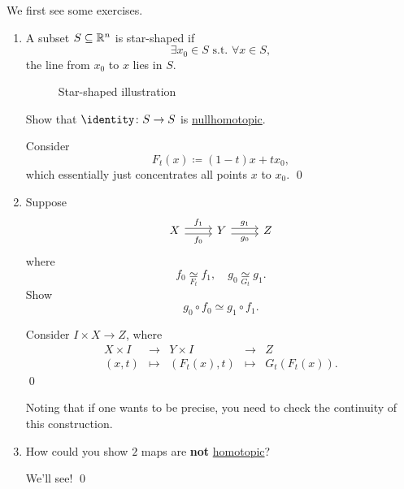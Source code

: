 \begin{exercise}
	We first see some exercises.
	\begin{enumerate}
		\item A subset \(S\subseteq \mathbb{\MakeUppercase{R}} ^n\) is star-shaped if
		      \[
			      \exists x_0\in S \text{ s.t. }\forall x\in S,
		      \]
		      the line from \(x_0\) to \(x\) lies in \(S\).
		      \begin{figure}[H]
			      \centering
			      \caption{Star-shaped illustration}
			      \label{fig:eg:star-shaped}
		      \end{figure}
		      Show that \(\identity\colon S\to S\) is \hyperref[def:nullhomotopic]{nullhomotopic}.

		      \begin{answer}
			      Consider
			      \[
				      F_{t}(x) \coloneqq (1 - t)x+tx_0,
			      \]
			      which essentially just concentrates all points \(x\) to \(x_0\).
			      \qed
		      \end{answer}
		\item Suppose
		      \[
			      \begin{tikzcd}
				      X & Y & Z
				      \arrow["{f_0}"', shift right=1, from=1-1, to=1-2]
				      \arrow["{g_0}"', shift right=1, from=1-2, to=1-3]
				      \arrow["{f_1}", shift left=1, from=1-1, to=1-2]
				      \arrow["{g_1}", shift left=1, from=1-2, to=1-3]
			      \end{tikzcd}
		      \]
		      where
		      \[
			      f_0 \underset{F_{t}}{\simeq} f_1,\quad g_0\underset{G_{t}}{\simeq} g_1.
		      \]
		      Show
		      \[
			      g_0\circ f_0\simeq g_{1}\circ f_1.
		      \]
		      \begin{answer}
			      Consider \(I\times X\to Z\), where
			      \[
				      \begin{array}{ccccc}
					      X \times I & \to     & Y \times I  & \to     & Z                \\
					      (x, t)     & \mapsto & (F_t(x), t) & \mapsto & G_{t}(F_{t}(x)).
				      \end{array}
			      \]
			      \qed
		      \end{answer}
		      \begin{remark}
			      Noting that if one wants to be precise, you need to check the continuity of this construction.
		      \end{remark}
		\item How could you show \(2\) maps are \textbf{not} \hyperref[def:homotopic]{homotopic}?
		      \begin{answer}
			      We'll see!
			      \qed
		      \end{answer}
	\end{enumerate}
\end{exercise}
